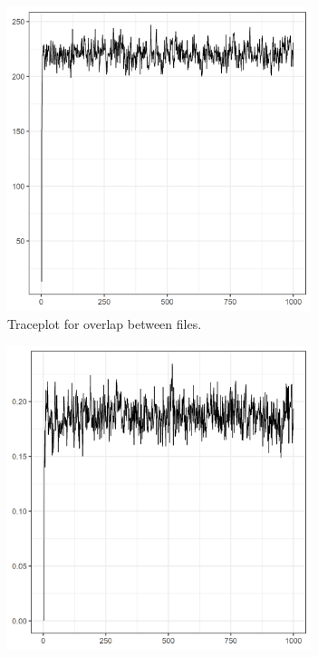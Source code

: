 \documentclass[ba,preprint]{imsart}
\begin{document}
    \begin{figure}[h!]
	\centering
	\begin{subfigure}[b]{0.475\textwidth}
		\centering
		\includegraphics[width=0.975\textwidth]{../notes/figures/el_salvador/overlap_trace} 
		\caption{Traceplot for overlap between files.}    
		\label{fig:overlap_trace}
	\end{subfigure}
	\hfill
	\begin{subfigure}[b]{0.475\textwidth}  
		\centering 
		\includegraphics[width=0.975\textwidth]{../notes/figures/el_salvador/pi_trace} 

\end{subfigure}
\end{figure}
\end{document}
